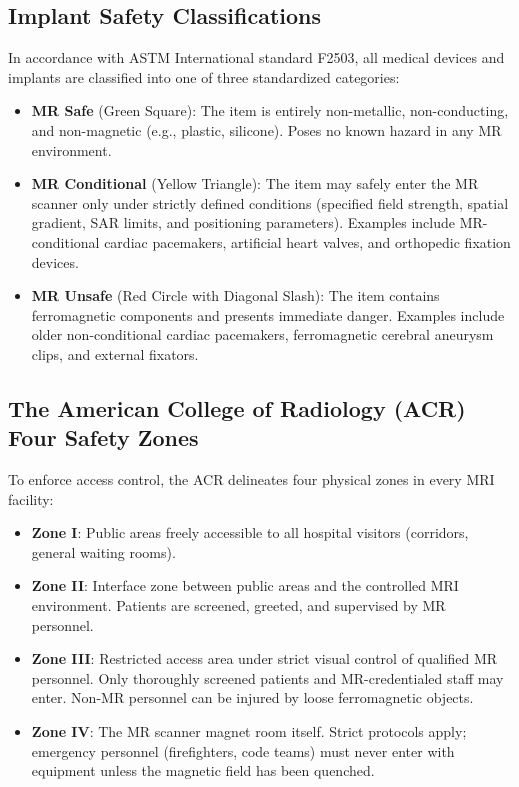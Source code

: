 \documentclass[11pt,a4paper]{article}
\begin{document}
\subsection{Implant Safety Classifications}
In accordance with ASTM International standard F2503, all medical devices and implants are classified into one of three standardized categories:
\begin{itemize}
    \item \textbf{MR Safe} (Green Square): The item is entirely non-metallic, non-conducting, and non-magnetic (e.g., plastic, silicone). Poses no known hazard in any MR environment.
    \item \textbf{MR Conditional} (Yellow Triangle): The item may safely enter the MR scanner only under strictly defined conditions (specified field strength, spatial gradient, SAR limits, and positioning parameters). Examples include MR-conditional cardiac pacemakers, artificial heart valves, and orthopedic fixation devices.
    \item \textbf{MR Unsafe} (Red Circle with Diagonal Slash): The item contains ferromagnetic components and presents immediate danger. Examples include older non-conditional cardiac pacemakers, ferromagnetic cerebral aneurysm clips, and external fixators.
\end{itemize}

\subsection{The American College of Radiology (ACR) Four Safety Zones}
To enforce access control, the ACR delineates four physical zones in every MRI facility:
\begin{itemize}
    \item \textbf{Zone I}: Public areas freely accessible to all hospital visitors (corridors, general waiting rooms).
    \item \textbf{Zone II}: Interface zone between public areas and the controlled MRI environment. Patients are screened, greeted, and supervised by MR personnel.
    \item \textbf{Zone III}: Restricted access area under strict visual control of qualified MR personnel. Only thoroughly screened patients and MR-credentialed staff may enter. Non-MR personnel can be injured by loose ferromagnetic objects.
    \item \textbf{Zone IV}: The MR scanner magnet room itself. Strict protocols apply; emergency personnel (firefighters, code teams) must never enter with equipment unless the magnetic field has been quenched.
\end{itemize}
\end{document}
